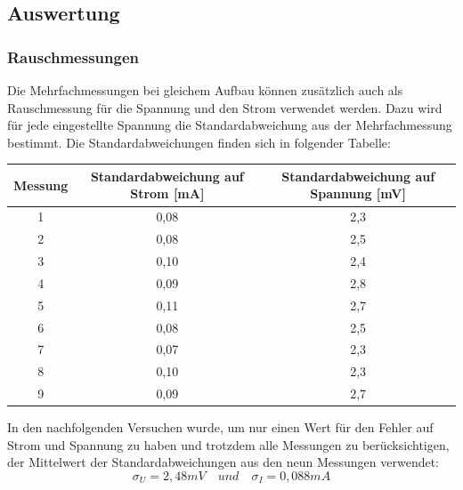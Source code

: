 \documentclass[12pt,a4paper]{article}
\begin{document}
\subsection{Auswertung}
\subsubsection{Rauschmessungen}
Die Mehrfachmessungen bei gleichem Aufbau können zusätzlich auch als Rauschmessung für die Spannung und den Strom verwendet werden. Dazu wird für jede eingestellte Spannung die Standardabweichung aus der Mehrfachmessung bestimmt. Die Standardabweichungen finden sich in folgender Tabelle: \\
\begin{center}
\begin{tabular}{|c|c|c|}
\hline 
Messung & Standardabweichung auf Strom [mA] & Standardabweichung auf Spannung [mV] \\ 
\hline 
1 & 0,08 & 2,3 \\ 
\hline 
2 & 0,08 & 2,5 \\ 
\hline 
3 & 0,10 & 2,4 \\ 
\hline 
4 & 0,09 & 2,8 \\ 
\hline 
5 & 0,11 & 2,7 \\ 
\hline 
6 & 0,08 & 2,5 \\ 
\hline 
7 & 0,07 & 2,3 \\ 
\hline 
8 & 0,10 & 2,3 \\ 
\hline 
9 & 0,09 & 2,7 \\ 
\hline 
\end{tabular}
\end{center}
In den nachfolgenden Versuchen wurde, um nur einen Wert für den Fehler auf Strom und Spannung zu haben und trotzdem alle Messungen zu berücksichtigen, der Mittelwert der Standardabweichungen aus den neun Messungen verwendet:
\[\sigma_U = 2,48 mV \quad und \quad \sigma_I = 0,088 mA \]
\end{document}
